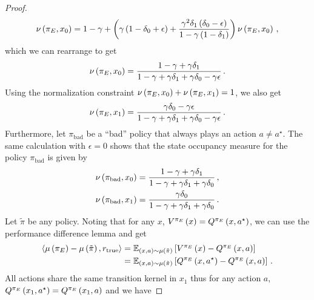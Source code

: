 \begin{proof}
    \begin{align*}
        \nu \left( {\pi_E}, x_0 \right) = 1 - \gamma + \left( \gamma \left( 1 - \delta_0 + \epsilon \right) + \frac{\gamma^2 \delta_1 \left( \delta_0 - \epsilon \right)}{1 - \gamma \left( 1 - \delta_1 \right)} \right) \nu \left( {\pi_E}, x_0 \right) \,,
    \end{align*}
    which we can rearrange to get
    \begin{align*}
        \nu \left( {\pi_E}, x_0 \right) = \frac{1 - \gamma + \gamma \delta_1}{1 - \gamma + \gamma \delta_1 + \gamma \delta_0 - \gamma \epsilon}\,.
    \end{align*}
    Using the normalization constraint $\nu \left( {\pi_E}, x_0 \right) + \nu \left( {\pi_E}, x_1 \right) = 1$, we also get
    \begin{equation*}
        \nu \left( {\pi_E}, x_1 \right) = \frac{\gamma \delta_0 - \gamma \epsilon}{1 - \gamma + \gamma \delta_1 + \gamma \delta_0 - \gamma \epsilon}\,.
    \end{equation*}
    Furthermore, let $\pi_{\mathrm{bad}}$ be a ``bad'' policy that always plays an action $a \neq a^\star$. The same calculation with $\epsilon = 0$ shows that the state occupancy measure for the policy $\pi_{\mathrm{bad}}$ is given by
    \begin{align*}
        \nu \left( \pi_{\mathrm{bad}}, x_0 \right) &= \frac{1 - \gamma + \gamma \delta_1}{1 - \gamma + \gamma \delta_1 + \gamma \delta_0}\,, \\
        \nu \left( \pi_{\mathrm{bad}}, x_1 \right) &= \frac{\gamma \delta_0}{1 - \gamma + \gamma \delta_1 + \gamma \delta_0}\,.
    \end{align*}
    Let $\tilde{\pi}$ be any policy. Noting that for any $x$, $V^{\pi_E} \left( x \right) = Q^{\pi_E} \left( x, a^\star \right)$, we can use the performance difference lemma and get
    \begin{align*}
        \left\langle \mu \left( {\pi_E} \right) - \mu \left( \tilde{\pi} \right), r_{\textup{true}} \right\rangle &= \mathbb{E}_{\left( x, a \right) \sim \mu \left( \tilde{\pi} \right)} \left[ V^{\pi_E} \left( x \right) - Q^{\pi_E} \left( x, a \right) \right] \\
        &= \mathbb{E}_{\left( x, a \right) \sim \mu \left( \tilde{\pi} \right)} \left[ Q^{\pi_E} \left( x, a^\star \right) - Q^{\pi_E} \left( x, a \right) \right]\,.
    \end{align*}
    All actions share the same transition kernel in $x_1$ thus for any action $a$, $Q^{\pi_E} \left( x_1, a^\star \right) = Q^{\pi_E} \left( x_1, a \right)$ and we have

\end{proof}
